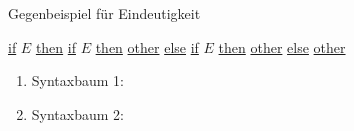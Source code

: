 \documentclass[a4paper,10pt]{scrartcl}
\renewcommand{\labelenumi}{\theenumi)}
\renewcommand{\theenumi}{\alph{enumi}}
\begin{document}
\section{}
Gegenbeispiel für Eindeutigkeit
\begin{center}
 \underline{if} $E$ \underline{then} \underline{if} $E$ \underline{then} \underline{other} \underline{else} \underline{if} $E$  \underline{then} \underline{other} \underline{else} \underline{other}
\end{center}
\renewcommand{\labelenumi}{(\theenumi)}
\renewcommand{\theenumi}{\roman{enumi}}
\begin{enumerate}
 \item Syntaxbaum 1:\\
       \begin{center}
       \end{center}
\item   Syntaxbaum 2:
        \begin{center}
        \end{center}
\end{enumerate}
\end{document}

